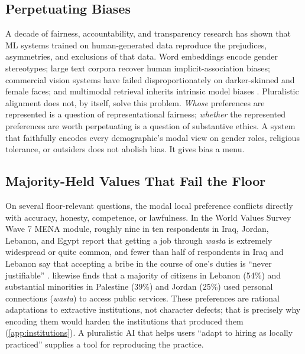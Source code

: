 \documentclass{article}
\theoremstyle{plain}
\theoremstyle{definition}
\theoremstyle{remark}
\begin{document}
\subsection{Perpetuating Biases}
\label{sec:bias}
A decade of fairness, accountability, and transparency research has shown that ML systems trained on human-generated data reproduce the prejudices, asymmetries, and exclusions of that data. Word embeddings encode gender stereotypes; large text corpora recover human implicit-association biases; commercial vision systems have failed disproportionately on darker-skinned and female faces; and multimodal retrieval inherits intrinsic model biases \citep{bolukbasi2016man, caliskan2017semantics, buolamwini2018gender, ghate-etal-2025-biases, bender2021stochastic}. Pluralistic alignment does not, by itself, solve this problem. \emph{Whose} preferences are represented is a question of representational fairness; \emph{whether} the represented preferences are worth perpetuating is a question of substantive ethics. A system that faithfully encodes every demographic's modal view on gender roles, religious tolerance, or outsiders does not abolish bias. It gives bias a menu.

\subsection{Majority-Held Values That Fail the Floor}
\label{sec:majority-failing}
On several floor-relevant questions, the modal local preference conflicts directly with accuracy, honesty, competence, or lawfulness. In the World Values Survey Wave 7 MENA module, roughly nine in ten respondents in Iraq, Jordan, Lebanon, and Egypt report that getting a job through \emph{wasta} is extremely widespread or quite common, and fewer than half of respondents in Iraq and Lebanon say that accepting a bribe in the course of one's duties is ``never justifiable'' \citep{wvs7}. \citet{transparency2019gcbmena} likewise finds that a majority of citizens in Lebanon (54\%) and substantial minorities in Palestine (39\%) and Jordan (25\%) used personal connections (\emph{wasta}) to access public services. These preferences are rational adaptations to extractive institutions, not character defects; that is precisely why encoding them would harden the institutions that produced them (\cref{app:institutions}). A pluralistic AI that helps users ``adapt to hiring as locally practiced'' supplies a tool for reproducing the practice.
\end{document}
